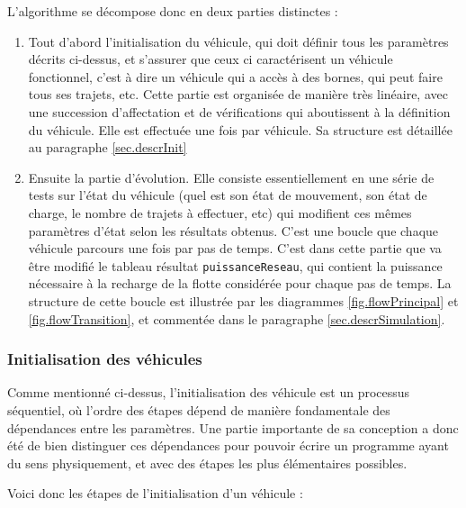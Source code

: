 \documentclass[10pt]{article}
\begin{document}
		L'algorithme se décompose donc en deux parties distinctes :
		\begin{enumerate}
		
			\item Tout d'abord l'initialisation du véhicule, qui doit définir tous les paramètres décrits ci-dessus, et s'assurer que ceux ci caractérisent un véhicule fonctionnel, c'est à dire un véhicule qui a accès à des bornes, qui peut faire tous ses trajets, etc. Cette partie est organisée de manière très linéaire, avec une succession d'affectation et de vérifications qui aboutissent à la définition du véhicule. Elle est effectuée une fois par véhicule. Sa structure est détaillée au paragraphe \ref{sec.descrInit}
			
			\item Ensuite la partie d'évolution. Elle consiste essentiellement en une série de tests sur l'état du véhicule (quel est son état de mouvement, son état de charge, le nombre de trajets à effectuer, etc) qui modifient ces mêmes paramètres d'état selon les résultats obtenus. C'est une boucle que chaque véhicule parcours une fois par pas de temps. C'est dans cette partie que va être modifié le tableau résultat \texttt{puissanceReseau}, qui contient la puissance nécessaire à la recharge de la flotte considérée pour chaque pas de temps. La structure de cette boucle est illustrée par les diagrammes \ref{fig.flowPrincipal} et \ref{fig.flowTransition}, et commentée dans le paragraphe \ref{sec.descrSimulation}.
		
		\end{enumerate}
		
		\subsubsection{Initialisation des véhicules \label{sec.descrInit}}
			
			Comme mentionné ci-dessus, l'initialisation des véhicule est un processus séquentiel, où l'ordre des étapes dépend de manière fondamentale des dépendances entre les paramètres. Une partie importante de sa conception a donc été de bien distinguer ces dépendances pour pouvoir écrire un programme ayant du sens physiquement, et avec des étapes les plus élémentaires possibles.
			
			Voici donc les étapes de l'initialisation d'un véhicule :
			
\end{document}
